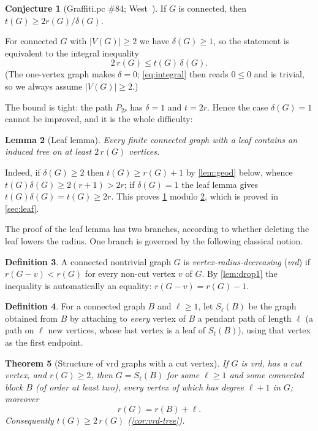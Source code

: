 \documentclass[11pt]{article}
\newtheorem{theorem}{Theorem}[section]
\newtheorem{lemma}[theorem]{Lemma}
\theoremstyle{definition}
\newtheorem{definition}[theorem]{Definition}
\newtheorem{fact}[theorem]{Conjecture}
\begin{document}
\begin{fact}[Graffiti.pc \#84; West~\cite{WestGraffiti}]\label{fact:84}
If $G$ is connected, then $t(G)\ge 2r(G)/\delta(G)$.
\end{fact}

For connected $G$ with $|V(G)|\ge2$ we have $\delta(G)\ge1$, so the statement
is equivalent to the integral inequality
\begin{equation}
 2\,r(G)\le t(G)\,\delta(G).\label{eq:integral}
\end{equation}
(The one-vertex graph makes $\delta=0$; \eqref{eq:integral} then reads $0\le0$
and is trivial, so we always assume $|V(G)|\ge2$.)

The bound is tight: the path $P_{2r}$ has $\delta=1$ and $t=2r$.  Hence the
case $\delta(G)=1$ cannot be improved, and it is the whole difficulty:

\begin{lemma}[Leaf lemma]\label{lem:leaf}
Every finite connected graph with a leaf contains an induced tree on at least
$2\,r(G)$ vertices.
\end{lemma}

Indeed, if $\delta(G)\ge2$ then $t(G)\ge r(G)+1$ by
\cref{lem:geod} below, whence
$t(G)\delta(G)\ge 2(r+1)>2r$; if $\delta(G)=1$ the leaf lemma gives
$t(G)\delta(G)=t(G)\ge 2r$.  This proves
\cref{fact:84} modulo \cref{lem:leaf}, which is proved in
\cref{sec:leaf}.

The proof of the leaf lemma has two branches, according to whether deleting
the leaf lowers the radius.  One branch is governed by the following
classical notion.

\begin{definition}\label{def:vrd}
A connected nontrivial graph $G$ is \emph{vertex-radius-decreasing}
(\emph{vrd}) if $r(G-v)<r(G)$ for every non-cut vertex $v$ of $G$.  By
\cref{lem:drop1} the inequality is automatically an equality:
$r(G-v)=r(G)-1$.
\end{definition}

\begin{definition}\label{def:SlB}
For a connected graph $B$ and $\ell\ge1$, let $S_\ell(B)$ be the graph
obtained from $B$ by attaching to \emph{every} vertex of $B$ a pendant path
of length $\ell$ (a path on $\ell$ new vertices, whose last vertex is a leaf
of $S_\ell(B)$), using that vertex as the first endpoint.
\end{definition}

\begin{theorem}[Structure of vrd graphs with a cut vertex]\label{thm:vrd}
If $G$ is vrd, has a cut vertex, and $r(G)\ge2$, then
$G=S_\ell(B)$ for some $\ell\ge1$ and some connected block $B$
(of order at least two), every vertex of which has degree
$\ell+1$ in $G$; moreover
\[
        r(G)=r(B)+\ell .
\]
Consequently $t(G)\ge 2\,r(G)$
(\cref{cor:vrd-tree}).
\end{theorem}
\end{document}
